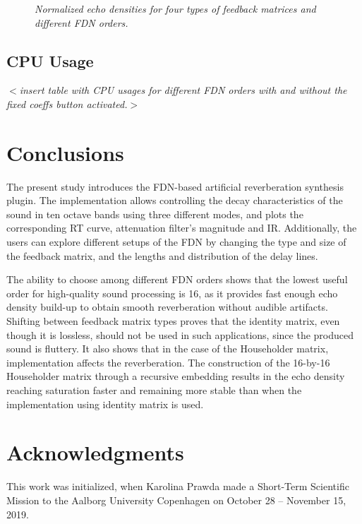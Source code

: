 \documentclass[twoside,a4paper]{article}
\begin{document}
\begin{figure}[ht!]
     \hfill
    \caption{\textit{Normalized echo densities for four types of feedback matrices and different FDN orders. }}
    \label{fig:echo}
\end{figure}

\subsection{CPU Usage}

$<$\textit{insert table with CPU usages for different FDN orders with and without the fixed coeffs button activated.}$>$

\section{Conclusions}

The present study introduces the FDN-based artificial reverberation synthesis plugin. The implementation allows controlling the decay characteristics of the sound in ten octave bands using three different modes, and plots the corresponding RT curve, attenuation filter's magnitude and IR. %
Additionally, the users can explore different setups of the FDN by changing the type and size of the feedback matrix, and the lengths and distribution of the delay lines. 

The ability to choose among different FDN orders shows that the lowest useful order for high-quality sound processing is 16, as it provides fast enough echo density build-up to obtain smooth reverberation without audible artifacts. Shifting between feedback matrix types proves that the identity matrix, even though it is lossless, should not be used in such applications, since the produced sound is fluttery. It also shows that in the case of the Householder matrix, implementation affects the reverberation. The construction of the 16-by-16 Householder matrix through a recursive embedding results in the echo density reaching saturation faster and remaining more stable than when the implementation using identity matrix is used.

\section{Acknowledgments}
This work was initialized, when Karolina Prawda made a Short-Term Scientific Mission to the Aalborg University Copenhagen on October 28 -- November 15, 2019. 


\end{document}

